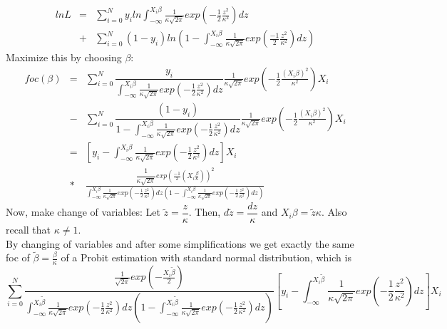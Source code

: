 \documentclass[11pt]{article}
\begin{document}
\begin{eqnarray}
ln L &=& \sum\limits_{i=0}^{N}  y_{i} ln \int_{-\infty}^{X_{i}\beta} \frac{1}{\kappa\sqrt{2\pi}}exp\left( -\frac{1}{2}\frac{z^{2}}{\kappa^{2}}\right) dz \nonumber \\
     &+& \sum\limits_{i=0}^{N} (1-y_{i})ln \left(1- \int_{-\infty}^{X_{i}\beta}\frac{1}{\kappa\sqrt{2\pi}}exp\left( \frac{-1}{2}\frac{z^{2}}{\kappa^{2}} \right)dz \right) \nonumber
\end{eqnarray}
Maximize this by choosing $\beta$:
\begin{eqnarray}
foc(\beta) &=& \sum\limits_{i=0}^{N} \dfrac{y_{i}}{\int_{-\infty}^{X_{i}\beta}\frac{1}{\kappa\sqrt{2\pi}}exp\left( -\frac{1}{2}\frac{z^{2}}{\kappa^{2}}\right)dz} \frac{1}{\kappa\sqrt{2\pi}}exp\left( -\frac{1}{2}\frac{(X_{i}\beta)^{2}}{\kappa^{2}}\right)X_{i} \nonumber \\
           &-& \sum\limits_{i=0}^{N} \dfrac{(1-y_{i})}{1-\int_{-\infty}^{X_{i}\beta}\frac{1}{\kappa\sqrt{2\pi}}exp\left( -\frac{1}{2}\frac{z^{2}}{\kappa^{2}}\right)dz} \frac{1}{\kappa\sqrt{2\pi}}exp\left( -\frac{1}{2}\frac{(X_{i}\beta)^{2}}{\kappa^{2}}\right)X_{i} \nonumber \nonumber \\
           &=& \left[y_{i}-\int_{-\infty}^{X_{i}\beta}\frac{1}{\kappa\sqrt{2\pi}}exp\left( -\frac{1}{2}\frac{z^{2}}{\kappa^{2}}\right) dz \right]X_{i} \nonumber \\
           &*& \frac{\dfrac{1}{\kappa \sqrt{2\pi}}exp\left(\frac{-1}{2}\left(X_{i}\frac{\beta}{\kappa}\right)\right)^2}{\int_{-\infty}^{X_{i}\beta}\frac{1}{\kappa\sqrt{2\pi}}exp\left( -\frac{1}{2}\frac{z^{2}}{\kappa^{2}}\right)dz \left(1-\int_{-\infty}^{X_{i}\beta}\frac{1}{\kappa\sqrt{2\pi}}exp\left( -\frac{1}{2}\frac{z^{2}}{\kappa^{2}}\right)dz\right)} \nonumber
\end{eqnarray}
Now, make change of variables: Let $\tilde{z}=\dfrac{z}{\kappa}$. Then, $d\tilde{z}=\dfrac{dz}{\kappa}$ and $X_{i}\beta=\tilde{z}\kappa$. Also recall that $\kappa \neq 1$.
\\
By changing of variables and after some simplifications we get exactly the same foc of $\tilde{\beta}=\frac{\beta}{\kappa}$ of a Probit estimation with standard normal distribution, which is
\begin{equation}
\sum\limits_{i=0}^{N}\frac{\frac{1}{\sqrt{2\pi}}exp\left( -\frac{X_{i}\tilde{\beta}}{2}\right)}{\int_{-\infty}^{X_{i}\tilde{\beta}}\frac{1}{\kappa\sqrt{2\pi}}exp\left( -\frac{1}{2}\frac{z^{2}}{\kappa^{2}}\right)dz \left(1-\int_{-\infty}^{X_{i}\tilde{\beta}}\frac{1}{\kappa\sqrt{2\pi}}exp\left( -\frac{1}{2}\frac{z^{2}}{\kappa^{2}}\right)dz\right)}\left[y_{i}-\int_{-\infty}^{X_{i}\tilde{\beta}}\frac{1}{\kappa\sqrt{2\pi}}exp\left( -\frac{1}{2}\frac{z^{2}}{\kappa^{2}}\right)dz \right]X_{i} \nonumber
\end{equation}
\end{document}

